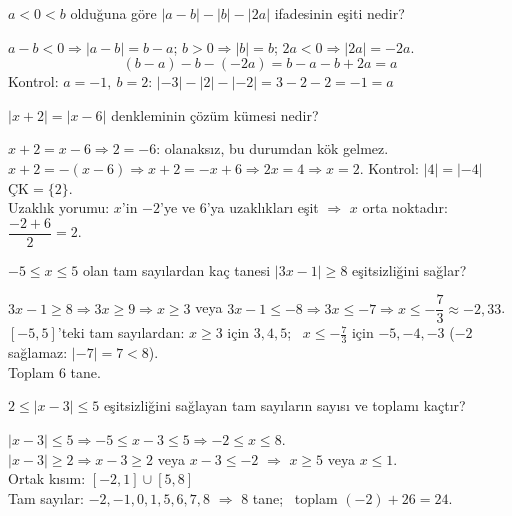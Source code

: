 \begin{alistirma}
\(a<0<b\) olduğuna göre \(|a-b|-|b|-|2a|\) ifadesinin eşiti nedir?
\end{alistirma}
\begin{cozum}
\(a-b<0\Rightarrow |a-b|=b-a\); \quad \(b>0\Rightarrow |b|=b\); \quad \(2a<0\Rightarrow |2a|=-2a\).
\[(b-a)-b-(-2a)=b-a-b+2a=a\]
Kontrol: \(a=-1,\ b=2\): \(|-3|-|2|-|-2|=3-2-2=-1=a\) \checkmark
\end{cozum}

\begin{alistirma}
\(|x+2|=|x-6|\) denkleminin çözüm kümesi nedir?
\end{alistirma}
\begin{cozum}
\(x+2=x-6\Rightarrow 2=-6\): olanaksız, bu durumdan kök gelmez.\\
\(x+2=-(x-6)\Rightarrow x+2=-x+6\Rightarrow 2x=4\Rightarrow x=2\). \quad Kontrol: \(|4|=|-4|\) \checkmark \quad \(\text{ÇK}=\{2\}\).\\
Uzaklık yorumu: \(x\)'in \(-2\)'ye ve \(6\)'ya uzaklıkları eşit \(\Rightarrow\) \(x\) orta noktadır: \(\dfrac{-2+6}{2}=2\).
\end{cozum}

\begin{alistirma}
\(-5\le x\le 5\) olan tam sayılardan kaç tanesi \(|3x-1|\ge 8\) eşitsizliğini sağlar?
\end{alistirma}
\begin{cozum}
\(3x-1\ge 8\Rightarrow 3x\ge 9\Rightarrow x\ge 3\) \quad veya \quad \(3x-1\le -8\Rightarrow 3x\le -7\Rightarrow x\le -\dfrac73\approx-2{,}33\).\\
\([-5,5]\)'teki tam sayılardan: \(x\ge 3\) için \(3,4,5\); \ \(x\le -\frac73\) için \(-5,-4,-3\) (\(-2\) sağlamaz: \(|-7|=7<8\)).\\
Toplam \(6\) tane.
\end{cozum}

\begin{alistirma}
\(2\le|x-3|\le 5\) eşitsizliğini sağlayan tam sayıların sayısı ve toplamı kaçtır?
\end{alistirma}
\begin{cozum}
\(|x-3|\le 5\Rightarrow -5\le x-3\le 5\Rightarrow -2\le x\le 8\).\\
\(|x-3|\ge 2\Rightarrow x-3\ge 2\) veya \(x-3\le -2\) \(\Rightarrow\) \(x\ge 5\) veya \(x\le 1\).\\
Ortak kısım: \([-2,1]\cup[5,8]\) \qquad {}\\
Tam sayılar: \(-2,-1,0,1,5,6,7,8\) \(\Rightarrow\) \(8\) tane; \ toplam \((-2)+26=24\).
\end{cozum}

